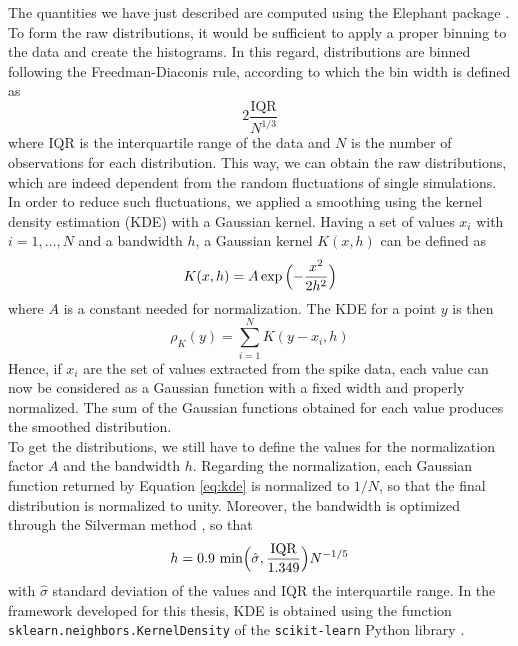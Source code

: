 \documentclass[a4paper, 12pt, twoside, openright]{book}
\begin{document}
The quantities we have just described are computed using the Elephant package \cite{elephant2018}. To form the raw distributions, it would be sufficient to apply a proper binning to the data and create the histograms. In this regard, distributions are binned following the Freedman-Diaconis rule, according to which the bin width is defined as
\begin{equation}
    \label{eq:fd_binning_rule}
    2\dfrac{\text{IQR}}{N^{1/3}}
\end{equation}
where $\text{IQR}$ is the interquartile range of the data and $N$ is the number of observations for each distribution. This way, we can obtain the raw distributions, which are indeed dependent from the random fluctuations of single simulations. In order to reduce such fluctuations, we applied a smoothing using the kernel density estimation (KDE) \cite{Rosenblatt1956, Parzen1962} with a Gaussian kernel. Having a set of values $x_i$ with $i=1,\dots, N$ and a bandwidth $h$, a Gaussian kernel $K(x,h)$ can be defined as
\begin{equation}
    K(x,h) = A \exp{\Bigl( -\frac{x^2}{2h^2} \Bigr)}
\end{equation}
where $A$ is a constant needed for normalization. The KDE for a point $y$ is then
\begin{equation}
\label{eq:kde}
    \rho_{K}(y) = \sum_{i=1}^{N} K(y-x_i, h)
\end{equation}
Hence, if $x_i$ are the set of values extracted from the spike data, each value can now be considered as a Gaussian function with a fixed width and properly normalized. The sum of the Gaussian functions obtained for each value produces the smoothed distribution.\\
To get the distributions, we still have to define the values for the normalization factor $A$ and the bandwidth $h$.
Regarding the normalization, each Gaussian function returned by Equation \eqref{eq:kde} is normalized to $1/N$, so that the final distribution is normalized to unity. Moreover, the bandwidth is optimized through the Silverman method \cite{Silverman1986}, so that
\begin{equation}
    h = 0.9\text{ min}\Bigl( \hat{\sigma}, \frac{\text{IQR}}{1.349} \Bigr)N^{-1/5}
\end{equation}
with $\hat{\sigma}$ standard deviation of the values and IQR the interquartile range. In the framework developed for this thesis, KDE is obtained using the function \\\texttt{sklearn.neighbors.KernelDensity} of the \texttt{scikit-learn} Python library \cite{scikit-learn}.
\end{document}
